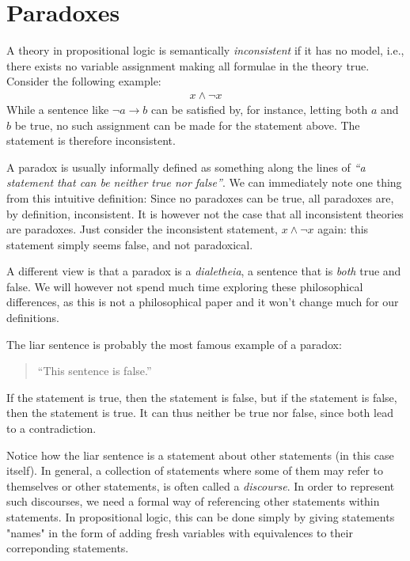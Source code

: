 \section{Paradoxes}
\label{sec:Paradoxes}
A theory in propositional logic is semantically \textit{inconsistent} if it has no model, i.e., there exists no variable assignment making all formulae in the theory true.
Consider the following example:
\begin{align}
  x \wedge \neg x
\end{align}
While a sentence like $\neg a \rightarrow b$ can be satisfied by, for instance, letting both $a$ and $b$ be true, no such assignment can be made for the statement above.
The statement is therefore inconsistent.

A paradox is usually informally defined as something along the lines of \textit{``a statement that can be neither true nor false''}.
We can immediately note one thing from this intuitive definition:
Since no paradoxes can be true, all paradoxes are, by definition, inconsistent.
It is however not the case that all inconsistent theories are paradoxes.
Just consider the inconsistent statement, $x \wedge \neg x$ again: this statement simply seems false, and not paradoxical.

A different view is that a paradox is a \textit{dialetheia}, a sentence that is \textit{both} true and false\cite{sep-dialetheism}. We will however not spend much time exploring these philosophical differences, as this is not a philosophical paper and it won't change much for our definitions.

The liar sentence is probably the most famous example of a paradox:
\begin{quote}
  ``This sentence is false.''
\end{quote}
If the statement is true, then the statement is false, but if the statement is false, then the statement is true.
It can thus neither be true nor false, since both lead to a contradiction.

Notice how the liar sentence is a statement about other statements (in this case itself).
In general, a collection of statements where some of them may refer to themselves or other statements, is often called a \textit{discourse}\cite{synthese-pdl}.
In order to represent such discourses, we need a formal way of referencing other statements within statements.
In propositional logic, this can be done simply by giving statements "names" in the form of adding fresh variables with equivalences to their correponding statements.

